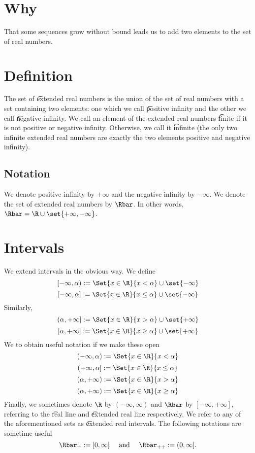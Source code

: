 
\section*{Why}

That some sequences grow without bound leads us to add two elements to the set of real numbers.

\section*{Definition}

The set of \t{extended real numbers} is the union of the set of real numbers with a set containing two elements: one which we call \t{positive infinity} and the other we call \t{negative infinity}.
We call an element of the extended real numbers \t{finite} if it is not positive or negative infinity.
Otherwise, we call it \t{infinite} (the only two infinite extended real numbers are exactly the two elements positive and negative infinity).

\subsection*{Notation}

We denote positive infinity by $+\infty$ and the negative infinity by $-\infty$.
We denote the set of extended real numbers by $\Rbar$.
In other words, $\Rbar = \R  \cup \set{+\infty,-\infty}$.

\section*{Intervals}

We extend intervals in the obvious way.
We define
\[
[-\infty, \alpha ) := \Set{x \in \R }{x <\alpha } \cup \set{-\infty}
\]
\[
[-\infty, \alpha ] := \Set{x \in \R }{x \leq \alpha } \cup \set{-\infty}
\]
Similarly,
\[
(\alpha , +\infty] := \Set{x \in \R }{x > \alpha } \cup \set{+\infty}
\]
\[
[\alpha , +\infty] := \Set{x \in \R }{x \geq \alpha } \cup \set{+\infty}
\]
We to obtain useful notation if we make these open
\[
(-\infty, \alpha ) := \Set{x \in \R }{x <\alpha }
\]
\[
(-\infty, \alpha ] := \Set{x \in \R }{x \leq \alpha }
\]
\[
(\alpha , +\infty) := \Set{x \in \R }{x > \alpha }
\]
\[
(\alpha , +\infty) := \Set{x \in \R }{x \geq \alpha }
\]
Finally, we sometimes denote $\R $ by $(-\infty, \infty)$ and $\Rbar$ by $[-\infty, +\infty]$, referring to the \t{real line} and \t{extended real line} respectively.
We refer to any of the aforementioned sets as \t{extended real intervals}.
The following notations are sometime useful
\[
\Rbar_+ := [0, \infty] \quad \text{ and } \quad \Rbar_{++} := (0, \infty].
\]
